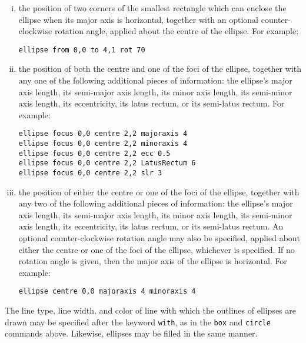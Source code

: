 \begin{enumerate}[(i)]
\item the position of two corners of the smallest rectangle which can enclose
the ellipse when its major axis is horizontal, together with an optional
counter-clockwise rotation angle, applied about the centre of the ellipse.
For example:

\begin{verbatim}
ellipse from 0,0 to 4,1 rot 70
\end{verbatim}

\item the position of both the centre and one of the foci of the ellipse,
together with any one of the following additional pieces of information: the
ellipse's major axis length, its semi-major axis length, its minor axis length,
its semi-minor axis length, its eccentricity, its latus rectum, or its
semi-latus rectum.  For example:

\begin{verbatim}
ellipse focus 0,0 centre 2,2 majoraxis 4
ellipse focus 0,0 centre 2,2 minoraxis 4
ellipse focus 0,0 centre 2,2 ecc 0.5
ellipse focus 0,0 centre 2,2 LatusRectum 6
ellipse focus 0,0 centre 2,2 slr 3
\end{verbatim}

\item the position of either the centre or one of the foci of the ellipse,
together with any two of the following additional pieces of information: the
ellipse's major axis length, its semi-major axis length, its minor axis length,
its semi-minor axis length, its eccentricity, its latus rectum, or its
semi-latus rectum. An optional counter-clockwise rotation angle may also be
specified, applied about either the centre or one of the foci of the ellipse,
whichever is specified. If no rotation angle is given, then the major axis of
the ellipse is horizontal.  For example:

\begin{verbatim}
ellipse centre 0,0 majoraxis 4 minoraxis 4
\end{verbatim}
\end{enumerate}

The line type, line width, and color of line with which the outlines of
ellipses are drawn may be specified after the keyword {\tt with}, as in the
{\tt box} and {\tt circle} commands above. Likewise, ellipses may be filled in
the same manner.


